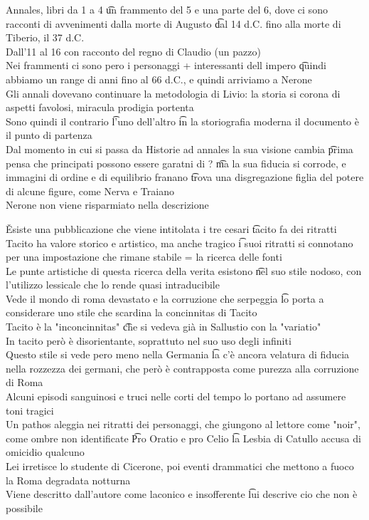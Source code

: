 \documentclass[12pt]{article}
\begin{document}
Annales, libri da 1 a 4 \t un frammento del 5 e una parte del 6, dove ci sono racconti di avvenimenti dalla morte di Augusto \t dal 14 d.C. fino alla morte di Tiberio, il 37 d.C. \\
Dall'11 al 16 con racconto del regno di Claudio (un pazzo) \\
Nei frammenti ci sono pero i personaggi + interessanti dell impero \t quindi abbiamo un range di anni fino al 66 d.C., e quindi arriviamo a Nerone \\
Gli annali dovevano continuare la metodologia di Livio: la storia si corona di aspetti favolosi, miracula prodigia portenta \\
Sono quindi il contrario \t l'uno dell'altro \t in la storiografia moderna il documento è il punto di partenza \\
Dal momento in cui si passa da Historie ad annales la sua visione cambia \t prima pensa che principati possono essere garatni di ? \t ma la sua fiducia si corrode, e immagini di ordine e di equilibrio franano \t trova una disgregazione figlia del potere di alcune figure, come Nerva e Traiano \\
Nerone non viene risparmiato nella descrizione 

\v

Esiste una pubblicazione che viene intitolata i tre cesari \t tacito fa dei ritratti \\
Tacito ha valore storico e artistico, ma anche tragico \t i suoi ritratti si connotano per una impostazione che rimane stabile = la ricerca delle fonti \\
Le punte artistiche di questa ricerca della verita esistono \t nel suo stile nodoso, con l'utilizzo lessicale che lo rende quasi intraducibile \\
Vede il mondo di roma devastato e la corruzione che serpeggia \t lo porta a considerare uno stile che scardina la concinnitas di Tacito \\
Tacito è la "inconcinnitas" \t che si vedeva già in Sallustio con la "variatio" \\
In tacito però è disorientante, soprattuto nel suo uso degli infiniti \\
Questo stile si vede pero meno nella Germania \t la c'è ancora velatura di fiducia nella rozzezza dei germani, che però è contrapposta come purezza alla corruzione di Roma \\
Alcuni episodi sanguinosi e truci nelle corti del tempo lo portano ad assumere toni tragici \\
Un pathos aleggia nei ritratti dei personaggi, che giungono al lettore come "noir", come ombre non identificate \t Pro Oratio e pro Celio \t la Lesbia di Catullo accusa di omicidio qualcuno \\
Lei irretisce lo studente di Cicerone, poi eventi drammatici che mettono a fuoco la Roma degradata notturna \\
Viene descritto dall'autore come laconico e insofferente \t lui descrive cio che non è possibile
\end{document}
